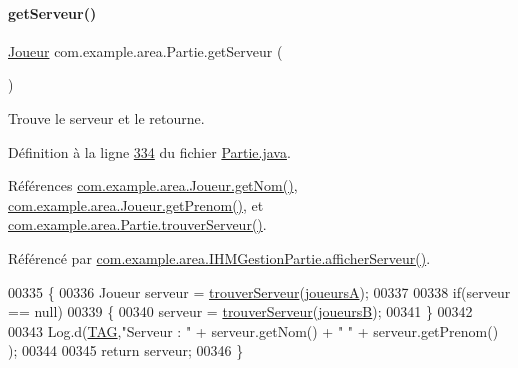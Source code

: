 \paragraph{\texorpdfstring{get\+Serveur()}{getServeur()}}
{\footnotesize\ttfamily \hyperlink{classcom_1_1example_1_1area_1_1_joueur}{Joueur} com.\+example.\+area.\+Partie.\+get\+Serveur (\begin{DoxyParamCaption}{ }\end{DoxyParamCaption})}



Trouve le serveur et le retourne. 



Définition à la ligne \hyperlink{_partie_8java_source_l00334}{334} du fichier \hyperlink{_partie_8java_source}{Partie.\+java}.



Références \hyperlink{_joueur_8java_source_l00039}{com.\+example.\+area.\+Joueur.\+get\+Nom()}, \hyperlink{_joueur_8java_source_l00047}{com.\+example.\+area.\+Joueur.\+get\+Prenom()}, et \hyperlink{_partie_8java_source_l00315}{com.\+example.\+area.\+Partie.\+trouver\+Serveur()}.



Référencé par \hyperlink{_i_h_m_gestion_partie_8java_source_l00447}{com.\+example.\+area.\+I\+H\+M\+Gestion\+Partie.\+afficher\+Serveur()}.


\begin{DoxyCode}
00335     \{
00336         Joueur serveur = \hyperlink{classcom_1_1example_1_1area_1_1_partie_a34c737de89dee9e2510fa5959e238a3e}{trouverServeur}(\hyperlink{classcom_1_1example_1_1area_1_1_partie_a190a033a96ec435589ac53f78d60890b}{joueursA});
00337 
00338         \textcolor{keywordflow}{if}(serveur == null)
00339         \{
00340             serveur = \hyperlink{classcom_1_1example_1_1area_1_1_partie_a34c737de89dee9e2510fa5959e238a3e}{trouverServeur}(\hyperlink{classcom_1_1example_1_1area_1_1_partie_a208910b83df461c3a2503f3b28650ce8}{joueursB});
00341         \}
00342 
00343         Log.d(\hyperlink{classcom_1_1example_1_1area_1_1_partie_ac0444402f7c570474df1c8b7ece88ad9}{TAG},\textcolor{stringliteral}{"Serveur : "} + serveur.getNom() + \textcolor{stringliteral}{" "} + serveur.getPrenom() );
00344 
00345         \textcolor{keywordflow}{return} serveur;
00346     \}
\end{DoxyCode}
\mbox{\label{classcom_1_1example_1_1area_1_1_partie_a3143072ab9e3a306a42a84ecac4bdcf1}} 
